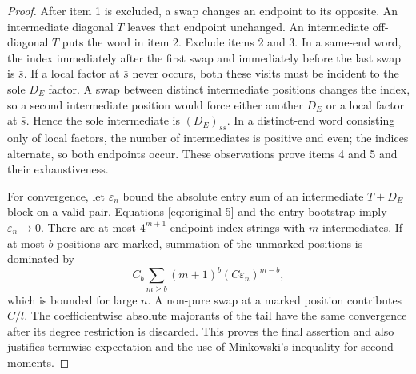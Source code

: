 \begin{proof}
After item 1 is excluded, a swap changes an endpoint to its opposite.
An intermediate diagonal \(T\) leaves that endpoint unchanged. An
intermediate off-diagonal \(T\) puts the word in item 2. Exclude
items 2 and 3. In a same-end word, the index immediately after the
first swap and immediately before the last swap is \(\bar s\).
If a local factor at \(\bar s\) never occurs, both these visits must
be incident to the sole \(D_E\) factor. A swap between distinct
intermediate positions changes the index, so a second intermediate
position would force either another \(D_E\) or a local factor at
\(\bar s\). Hence the sole intermediate is
\((D_E)_{\bar s\bar s}\). In a distinct-end word consisting only of
local factors, the number of intermediates is positive and even;
the indices alternate, so both endpoints occur. These observations
prove items 4 and 5 and their exhaustiveness.

For convergence, let \(\varepsilon_n\) bound the absolute entry sum
of an intermediate \(T+D_E\) block on a valid pair.
Equations \eqref{eq:original-5} and the entry bootstrap imply
\(\varepsilon_n\to0\). There are at most \(4^{m+1}\) endpoint
index strings with \(m\) intermediates. If at most \(b\) positions
are marked, summation of the unmarked positions is dominated by
\[
 C_b\sum_{m\ge b}(m+1)^b(C\varepsilon_n)^{m-b},
\]
which is bounded for large \(n\). A non-pure swap at a marked
position contributes \(C/l\). The coefficientwise absolute
majorants of the tail have the same convergence after its degree
restriction is discarded. This proves the final assertion and also
justifies termwise expectation and the use of Minkowski's inequality
for second moments.
\end{proof}

